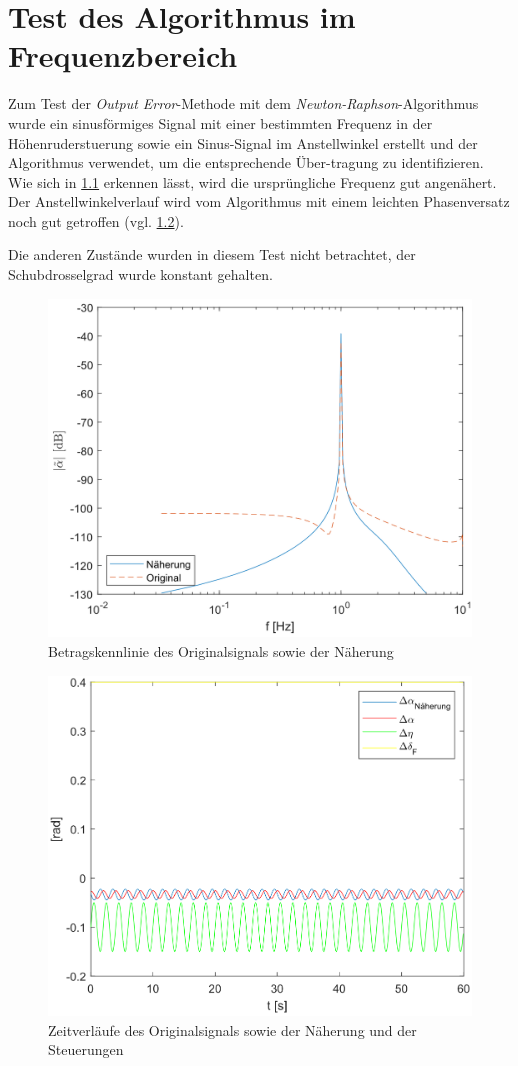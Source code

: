 \chapter{Test des Algorithmus im Frequenzbereich}\label{appendix:test_algorithmus}

Zum Test der \textit{Output Error}-Methode mit dem \textit{Newton-Raphson}-Algorithmus wurde ein sinusförmiges Signal 
mit einer bestimmten Frequenz in der Höhenruderstuerung sowie ein Sinus-Signal im Anstellwinkel erstellt und der Algorithmus 
verwendet, um die entsprechende Über-tragung zu identifizieren. Wie sich in 
\cref{fig:testdaten1} erkennen lässt, wird die 
ursprüngliche Frequenz gut angenähert. Der Anstellwinkelverlauf wird vom Algorithmus mit einem leichten Phasenversatz noch 
gut getroffen (vgl. \cref{fig:testdaten2}).\par
Die anderen Zustände wurden in diesem Test nicht betrachtet, der Schubdrosselgrad wurde konstant gehalten.

\begin{figure}[!h]
	\centering
	\includegraphics[width=0.6\linewidth]{src/pics/Testdaten1}
	\caption{Betragskennlinie des Originalsignals sowie der Näherung}
	\label{fig:testdaten1}
\end{figure}

\begin{figure}[!h]
	\centering
	\includegraphics[width=0.6\linewidth]{src/pics/Testdaten2}
	\caption{Zeitverläufe des Originalsignals sowie der Näherung und der 
	Steuerungen}
	\label{fig:testdaten2}
\end{figure}
